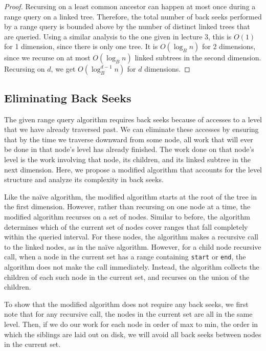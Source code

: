 \documentclass[11pt, oneside]{article}
\newcommand{\ms}{\texttt}
\begin{document}
\begin{proof}
    Recursing on a least common ancestor can happen at most once during a range
    query on a linked tree. Therefore, the total number of back seeks performed
    by a range query is bounded above by the number of distinct linked trees
    that are queried. Using a similar analysis to the one given in lecture 3,
    this is $O(1)$ for 1 dimension, since there is only one tree. It is
    $O(\log_B n)$ for 2 dimensions, since we recurse on at most $O(\log_B n)$
    linked subtrees in the second dimension. Recursing on $d$, we get
    $O(\log_B^{d-1}n)$ for $d$ dimensions.

\end{proof}

\subsection{Eliminating Back Seeks}

The given range query algorithm requires back seeks because of accesses to a
level that we have already traversed past. We can eliminate these accesses by
ensuring that by the time we traverse downward from some node, all work that
will ever be done in that node's level has already finished. The work done on
that node's level is the work involving that node, its children, and its linked
subtree in the next dimension. Here, we propose a modified algorithm that
accounts for the level structure and analyze its complexity in back seeks.

Like the na{\"i}ve algorithm, the modified algorithm starts at the root of the tree
in the first dimension. However, rather than recursing on one node at a time,
the modified algorithm recurses on a set of nodes. Similar to before, the
algorithm determines which of the current set of nodes cover ranges that
fall completely within the queried interval. For these nodes, the algorithm
makes a recursive call to the linked nodes, as in the na{\"i}ve algorithm. However,
for a child node recursive call, when a node in the current set has a range
containing \ms{start} or \ms{end}, the algorithm does not make the call
immediately. Instead, the algorithm collects the children of each such node in
the current set, and recurses on the union of the children.

To show that the modified algorithm does not require any back seeks, we first
note that for any recursive call, the nodes in the current set are all in the
same level. Then, if we do our work for each node in order of max to min, the
order in which the siblings are laid out on disk, we will avoid all back seeks
between nodes in the current set. \\
\end{document}
